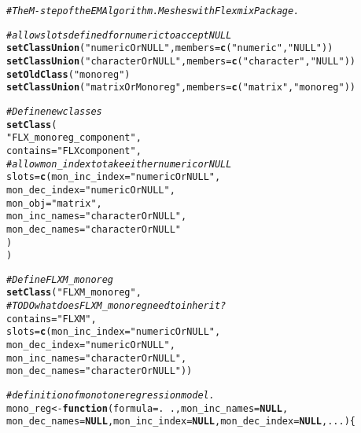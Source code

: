 \documentclass[10pt]{olplainarticle}\usepackage[]{graphicx}\usepackage[]{color}
\makeatletter
\newcommand{\hlstr}[1]{\textcolor[rgb]{0.192,0.494,0.8}{#1}}%
\newcommand{\hlcom}[1]{\textcolor[rgb]{0.678,0.584,0.686}{\textit{#1}}}%
\newcommand{\hlopt}[1]{\textcolor[rgb]{0,0,0}{#1}}%
\newcommand{\hlstd}[1]{\textcolor[rgb]{0.345,0.345,0.345}{#1}}%
\newcommand{\hlkwa}[1]{\textcolor[rgb]{0.161,0.373,0.58}{\textbf{#1}}}%
\newcommand{\hlkwb}[1]{\textcolor[rgb]{0.69,0.353,0.396}{#1}}%
\newcommand{\hlkwc}[1]{\textcolor[rgb]{0.333,0.667,0.333}{#1}}%
\newcommand{\hlkwd}[1]{\textcolor[rgb]{0.737,0.353,0.396}{\textbf{#1}}}%
\newenvironment{kframe}{%
 \def\at@end@of@kframe{}%
 \ifinner\ifhmode%
  \def\at@end@of@kframe{\end{minipage}}%
  \begin{minipage}{\columnwidth}%
 \fi\fi%
 \def\FrameCommand##1{\hskip\@totalleftmargin \hskip-\fboxsep
 \colorbox{shadecolor}{##1}\hskip-\fboxsep
     \hskip-\linewidth \hskip-\@totalleftmargin \hskip\columnwidth}%
 \MakeFramed {\advance\hsize-\width
   \@totalleftmargin\z@ \linewidth\hsize
   \@setminipage}}%
 {\par\unskip\endMakeFramed%
 \at@end@of@kframe}
\newenvironment{knitrout}{}{} %
\makeatother
\begin{document}
\begin{appendices}
\begin{knitrout}
\color{fgcolor}\begin{kframe}
\begin{alltt}
\hlcom{# The M-step of the EM Algorithm. Meshes with Flexmix Package.}

\hlcom{# allow slots defined for numeric to accept NULL}
\hlkwd{setClassUnion}\hlstd{(}\hlstr{"numericOrNULL"}\hlstd{,}\hlkwc{members}\hlstd{=}\hlkwd{c}\hlstd{(}\hlstr{"numeric"}\hlstd{,} \hlstr{"NULL"}\hlstd{))}
\hlkwd{setClassUnion}\hlstd{(}\hlstr{"characterOrNULL"}\hlstd{,} \hlkwc{members} \hlstd{=} \hlkwd{c}\hlstd{(}\hlstr{"character"}\hlstd{,} \hlstr{"NULL"}\hlstd{))}
\hlkwd{setOldClass}\hlstd{(}\hlstr{"monoreg"}\hlstd{)}
\hlkwd{setClassUnion}\hlstd{(}\hlstr{"matrixOrMonoreg"}\hlstd{,} \hlkwc{members} \hlstd{=} \hlkwd{c}\hlstd{(}\hlstr{"matrix"}\hlstd{,} \hlstr{"monoreg"}\hlstd{))}

\hlcom{# Define new classes}
\hlkwd{setClass}\hlstd{(}
  \hlstr{"FLX_monoreg_component"}\hlstd{,}
  \hlkwc{contains}\hlstd{=}\hlstr{"FLXcomponent"}\hlstd{,}
  \hlcom{# allow mon_index to take either numeric or NULL}
  \hlkwc{slots}\hlstd{=}\hlkwd{c}\hlstd{(}\hlkwc{mon_inc_index}\hlstd{=}\hlstr{"numericOrNULL"}\hlstd{,}
          \hlkwc{mon_dec_index}\hlstd{=}\hlstr{"numericOrNULL"}\hlstd{,}
          \hlkwc{mon_obj}\hlstd{=}\hlstr{"matrix"}\hlstd{,}
          \hlkwc{mon_inc_names}\hlstd{=}\hlstr{"characterOrNULL"}\hlstd{,}
          \hlkwc{mon_dec_names}\hlstd{=}\hlstr{"characterOrNULL"}
          \hlstd{)}
\hlstd{)}

\hlcom{# Define FLXM_monoreg }
\hlkwd{setClass}\hlstd{(}\hlstr{"FLXM_monoreg"}\hlstd{,}
         \hlcom{# TODO what does FLXM_monoreg need to inherit?}
         \hlkwc{contains} \hlstd{=} \hlstr{"FLXM"}\hlstd{,}
         \hlkwc{slots} \hlstd{=} \hlkwd{c}\hlstd{(}\hlkwc{mon_inc_index}\hlstd{=}\hlstr{"numericOrNULL"}\hlstd{,}
                   \hlkwc{mon_dec_index}\hlstd{=}\hlstr{"numericOrNULL"}\hlstd{,}
                   \hlkwc{mon_inc_names}\hlstd{=}\hlstr{"characterOrNULL"}\hlstd{,}
                   \hlkwc{mon_dec_names}\hlstd{=}\hlstr{"characterOrNULL"}\hlstd{))}






\hlcom{# definition of monotone regression model.}
\hlstd{mono_reg} \hlkwb{<-} \hlkwa{function} \hlstd{(}\hlkwc{formula} \hlstd{= .}\hlopt{~}\hlstd{.,} \hlkwc{mon_inc_names} \hlstd{=} \hlkwa{NULL}\hlstd{,}
                      \hlkwc{mon_dec_names} \hlstd{=} \hlkwa{NULL}\hlstd{,} \hlkwc{mon_inc_index}\hlstd{=}\hlkwa{NULL}\hlstd{,} \hlkwc{mon_dec_index}\hlstd{=}\hlkwa{NULL}\hlstd{,} \hlkwc{...}\hlstd{) \{}


\end{alltt}
\end{kframe}
\end{knitrout}
\end{appendices}
\end{document}
